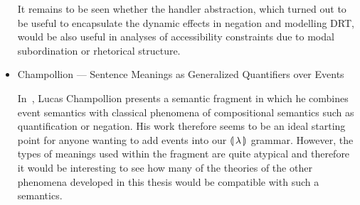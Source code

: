 \begin{itemize}
  It remains to be seen whether the handler abstraction, which turned out
  to be useful to encapsulate the dynamic effects in negation and modelling
  DRT, would be also useful in analyses of accessibility constraints due to
  modal subordination or rhetorical structure.


\item Champollion --- Sentence Meanings as Generalized Quantifiers over Events

  In~\cite{champollion2015interaction}, Lucas Champollion presents a
  semantic fragment in which he combines event semantics with classical
  phenomena of compositional semantics such as quantification or
  negation. His work therefore seems to be an ideal starting point for
  anyone wanting to add events into our ${\llparenthesis \, \lambda \, \rrparenthesis}$ grammar. However, the types
  of meanings used within the fragment are quite atypical and therefore it
  would be interesting to see how many of the theories of the other
  phenomena developed in this thesis would be compatible with such a
  semantics.
  
\end{itemize}
